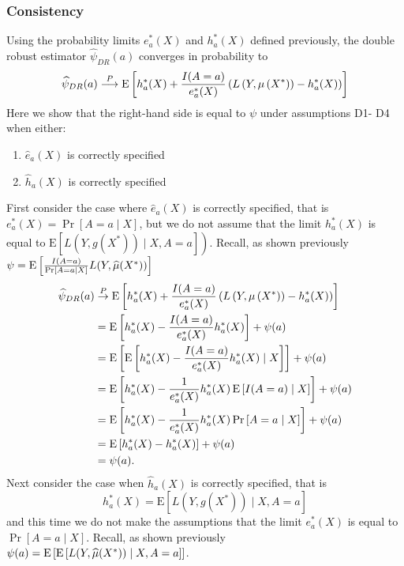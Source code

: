 \subsubsection{Consistency}
Using the probability limits $e_a^*(X)$ and $h_a^*(X)$ defined previously, the double robust estimator $\widehat{\psi}_{DR}(a)$ converges in probability to 
$$\widehat{\psi}_{DR}(a) \stackrel{P}{\longrightarrow} \operatorname{E}\left[h^*_a(X)+\frac{I(A = a)}{e^*_a(X)}\left(L\left(Y, \mu\left(X^*\right)\right)-h^*_a(X)\right)\right]$$
Here we show that the right-hand side is equal to $\psi$ under assumptions D1-
D4 when either:
\begin{enumerate}
    \item $\widehat{e}_a(X)$ is correctly specified
    \item $\widehat{h}_a(X)$ is correctly specified
\end{enumerate}
First consider the case where $\widehat{e}_a(X)$ is correctly specified, that is $e^*_a(X)=\operatorname{Pr}[A=a \mid X]$, but we do not assume that the limit $h^*_a(X)$ is equal to $\left.\mathrm{E}\left[L\left(Y, g\left(X^*\right)\right) \mid X, A=a\right]\right)$. Recall, as shown previously $\psi = \operatorname{E}\left[\frac{I(A = a)}{\Pr[A = a \mid X]}L(Y, \widehat{\mu}(X^*))\right] $
$$
\begin{aligned}
\widehat{\psi}_{DR}(a) & \stackrel{P}{\rightarrow}  \operatorname{E}\left[h^*_a(X)+\frac{I(A = a)}{e^*_a(X)}\left(L\left(Y, \mu\left(X^*\right)\right)-h^*_a(X)\right)\right] \\
& =\operatorname{E}\left[h^*_a(X)-\frac{I(A = a)}{e^*_a(X)}h^*_a(X)\right]+\psi(a) \\
& =\operatorname{E}\left[\operatorname{E}\left[h^*_a(X)-\frac{I(A = a)}{e^*_a(X)}h^*_a(X) \mid X \right]\right]+\psi(a) \\
& =\operatorname{E}\left[h^*_a(X)-\frac{1}{e^*_a(X)}h^*_a(X) \operatorname{E}\left[I(A = a) \mid X \right]\right]+\psi(a) \\
& =\operatorname{E}\left[h^*_a(X)-\frac{1}{e^*_a(X)}h^*_a(X) \Pr\left[A = a \mid X \right]\right]+\psi(a) \\
& =\operatorname{E}\left[h^*_a(X)-h^*_a(X)\right]+\psi(a) \\
& =\psi(a) .
\end{aligned}
$$
Next consider the case when $\widehat{h}_a(X)$ is correctly specified, that is
$$
h^*_a(X)=\mathrm{E}\left[L\left(Y, g\left(X^*\right)\right) \mid X, A=a\right]
$$
and this time we do not make the assumptions that the limit $e^*_a(X)$ is equal to $\operatorname{Pr}[A=a \mid X]$. Recall, as shown previously $\psi(a) = \operatorname{E}\left[\operatorname{E}\left[L(Y, \widehat{\mu}(X^*))\mid X, A = a\right]\right] $. 

